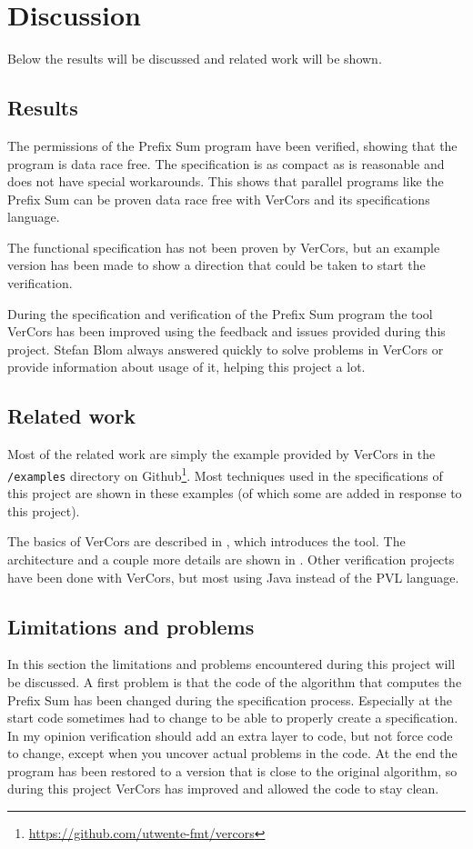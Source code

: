 \documentclass[a4paper]{article}
\newcommand{\code}[1]{\texttt{\small \color{inline}#1}} %
\begin{document}
\section{Discussion}\label{chapter:discussion}
Below the results will be discussed and related work will be shown.

\subsection{Results}
The permissions of the Prefix Sum program have been verified, showing that the program is data race free. The specification is as compact as is reasonable and does not have special workarounds. This shows that parallel programs like the Prefix Sum can be proven data race free with VerCors and its specifications language.

The functional specification has not been proven by VerCors, but an example version has been made to show a direction that could be taken to start the verification.

During the specification and verification of the Prefix Sum program the tool VerCors has been improved using the feedback and issues provided during this project. Stefan Blom always answered quickly to solve problems in VerCors or provide information about usage of it, helping this project a lot.

\subsection{Related work}
Most of the related work are simply the example provided by VerCors in the \code{/examples} directory on Github\footnote{\url{https://github.com/utwente-fmt/vercors}}. Most techniques used in the specifications of this project are shown in these examples (of which some are added in response to this project).

The basics of VerCors are described in \cite{blom2014vercors}, which introduces the tool. The architecture and a couple more details are shown in \cite{amighi2012vercors}. Other verification projects have been done with VerCors, but most using Java instead of the PVL language.

\subsection{Limitations and problems}
In this section the limitations and problems encountered during this project will be discussed. A first problem is that the code of the algorithm that computes the Prefix Sum has been changed during the specification process. Especially at the start code sometimes had to change to be able to properly create a specification. In my opinion verification should add an extra layer to code, but not force code to change, except when you uncover actual problems in the code. At the end the program has been restored to a version that is close to the original algorithm, so during this project VerCors has improved and allowed the code to stay clean.
\end{document}
